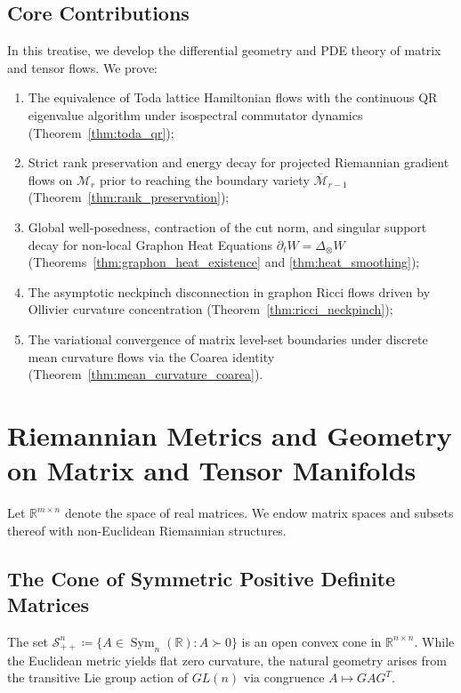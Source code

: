 \documentclass[11pt,a4paper,reqno]{amsart}
\theoremstyle{definition}
\numberwithin{equation}{section}
\providecommand{\R}{\mathbb{R}}
\providecommand{\R}{\mathbb{R}}
\begin{document}
\subsection*{Core Contributions}
In this treatise, we develop the differential geometry and PDE theory of matrix and tensor flows. We prove:
\begin{enumerate}[label=\arabic*.]
    \item The equivalence of Toda lattice Hamiltonian flows with the continuous QR eigenvalue algorithm under isospectral commutator dynamics (Theorem~\ref{thm:toda_qr});
    \item Strict rank preservation and energy decay for projected Riemannian gradient flows on $\mathcal{M}_r$ prior to reaching the boundary variety $\overline{\mathcal{M}}_{r-1}$ (Theorem~\ref{thm:rank_preservation});
    \item Global well-posedness, contraction of the cut norm, and singular support decay for non-local Graphon Heat Equations $\partial_t W = \Delta_\otimes W$ (Theorems~\ref{thm:graphon_heat_existence} and \ref{thm:heat_smoothing});
    \item The asymptotic neckpinch disconnection in graphon Ricci flows driven by Ollivier curvature concentration (Theorem~\ref{thm:ricci_neckpinch});
    \item The variational convergence of matrix level-set boundaries under discrete mean curvature flows via the Coarea identity (Theorem~\ref{thm:mean_curvature_coarea}).
\end{enumerate}

\section{Riemannian Metrics and Geometry on Matrix and Tensor Manifolds}
\label{sec:riemannian_geometry}

Let $\R^{m \times n}$ denote the space of real matrices. We endow matrix spaces and subsets thereof with non-Euclidean Riemannian structures.

\subsection{The Cone of Symmetric Positive Definite Matrices}
\label{subsec:cone_spd}
The set $\mathcal{S}_{++}^n \coloneqq \{A \in \operatorname{Sym}_n(\R) \colon A \succ 0\}$ is an open convex cone in $\R^{n \times n}$. While the Euclidean metric yields flat zero curvature, the natural geometry arises from the transitive Lie group action of $GL(n)$ via congruence $A \mapsto G A G^T$.
\end{document}
